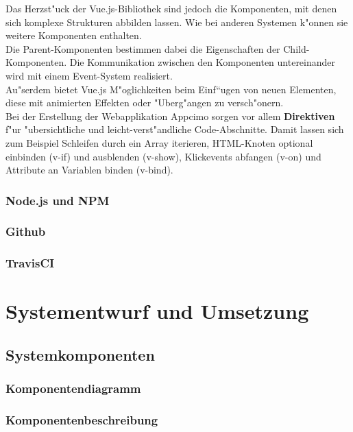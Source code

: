 \documentclass[a4paper, 11pt]{scrreprt}
\begin{document}
Das Herzst"uck der Vue.js-Bibliothek sind jedoch die Komponenten, mit denen sich komplexe Strukturen abbilden lassen. Wie bei anderen Systemen k"onnen sie weitere Komponenten enthalten.\\
Die Parent-Komponenten bestimmen dabei die Eigenschaften der Child-Komponenten. Die Kommunikation zwischen den Komponenten untereinander wird mit einem Event-System realisiert.\\

Au"serdem bietet Vue.js M"oglichkeiten beim Einf“ugen von neuen Elementen, diese mit animierten Effekten oder "Uberg"angen zu versch"onern.\\

Bei der Erstellung der Webapplikation Appcimo sorgen vor allem \textbf{Direktiven} f"ur "ubersichtliche und leicht-verst"andliche Code-Abschnitte. Damit lassen sich zum Beispiel Schleifen durch ein Array iterieren, HTML-Knoten optional einbinden (v-if) und ausblenden (v-show), Klickevents abfangen (v-on) und Attribute an Variablen binden (v-bind).


\subsection{Node.js und NPM}

\subsection{Github}

\subsection{TravisCI}


\chapter{Systementwurf und Umsetzung}

\section{Systemkomponenten}

\subsection{Komponentendiagramm}

\subsection{Komponentenbeschreibung}
\end{document}
